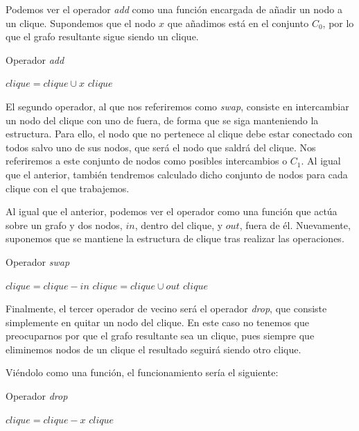 Podemos ver el operador \textit{add} como una función encargada de añadir un nodo a un clique.
Supondemos que el nodo $x$ que añadimos está en el conjunto $C_0$, por lo que el grafo resultante
sigue siendo un clique.

\begin{algorithm}[H]
\caption{Operador \textit{add}}
  \begin{algorithmic}
    \State $clique = clique \cup x$
    \Return $clique$
  \EndFunction
  \end{algorithmic}
\end{algorithm}

El segundo operador, al que nos referiremos como \textit{swap}, consiste en intercambiar un
nodo del clique con uno de fuera, de forma que se siga manteniendo la estructura. Para ello,
el nodo que no pertenece al clique debe estar conectado con todos salvo uno de sus nodos,
que será el nodo que saldrá del clique. Nos referiremos a este conjunto de nodos como posibles
intercambios o $C_1$. Al igual que el anterior, también tendremos calculado dicho conjunto de
nodos para cada clique con el que trabajemos.

Al igual que el anterior, podemos ver el operador como una función que actúa sobre un grafo y
dos nodos, $in$, dentro del clique, y $out$, fuera de él. Nuevamente, suponemos que se mantiene
la estructura de clique tras realizar las operaciones.

\begin{algorithm}[H]
\caption{Operador \textit{swap}}
  \begin{algorithmic}
    \State $clique = clique - in$
    \State $clique = clique \cup out$
    \Return $clique$
  \EndFunction
  \end{algorithmic}
\end{algorithm}

Finalmente, el tercer operador de vecino será el operador \textit{drop}, que consiste simplemente en quitar
un nodo del clique. En este caso no tenemos que preocuparnos por que el grafo resultante sea un clique,
pues siempre que eliminemos nodos de un clique el resultado seguirá siendo otro clique.

Viéndolo como una función, el funcionamiento sería el siguiente:

\begin{algorithm}[H]
\caption{Operador \textit{drop}}
  \begin{algorithmic}
    \State $clique = clique - x$
    \Return $clique$
  \EndFunction
  \end{algorithmic}
\end{algorithm}


